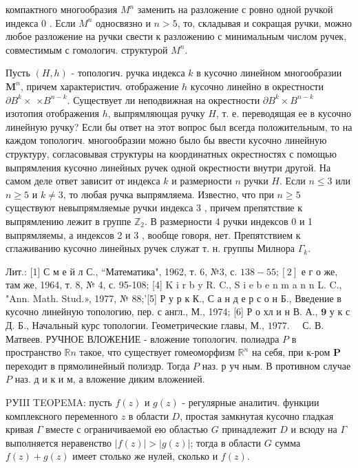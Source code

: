 \documentclass[10pt]{article}
\begin{document}
компактного многообразия $M^{n}$ заменить на разложение с ровно одной ручкой индекса 0 . Если $M^{n}$ односвязно и $n>5$, то, складывая и сокращая ручки, можно любое разложение на ручки свести к разложению с минимальным числом ручек, совместимым с гомологич. структурой $M^{n}$.



Пусть $(H, h)$ - топологич. ручка индекса $k$ в кусочно линейном многообразии $\boldsymbol{M}^{n}$, причем характеристич. отображение $h$ кусочно линейно в окрестности $\partial B^{k} \times$ $\times B^{n-k}$. Существует ли неподвижная на окрестности $\partial B^{k} \times B^{n-k}$ изотопия отображения $h$, выпрямляющая ручку $H$, т. е. переводящая ее в кусочно линейную ручку? Если бы ответ на этот вопрос был всегда положительным, то на каждом топологич. многообразии можно было бы ввести кусочно линейную структуру, согласовывая структуры на координатных окрестностях с помощью выпрямления кусочно линейных ручек одной окрестности внутри другой. На самом деле ответ зависит от индекса $k$ и размерности $n$ ручки $H$. Если $n \leqslant 3$ или $n \geqslant 5$ и $k \neq 3$, то любая ручка выпрямляема. Известно, что при $n \geqslant 5$ существуют невыпрямляемые ручки индекса 3 , причем препятствие к выпрямлению лежит в группе $\mathbb{Z}_{2}$. В размерности 4 ручки индексов 0 и 1 выпрямляемы, а индексов 2 и 3 , вообще говоря, нет. Препятствием к сглаживанию кусочно линейных ручек служат т. н. группы Милнора $\Gamma_{k}$.



Лит.: [1] С м е й л С., “Математика", 1962, т. 6, №3, с. $138-55 ;[2]$ е г о же, там же, 1964, т. 8, № 4, с. 95-108; [4] K i r b y R. C., S i e b e n m a n n L. C., "Ann. Math. Stud.», 1977, № 88;'[5] Р у р к К., С а н д е р с о н Б., Введение в кусочно линейную топологию, пер. с англ., М., 1974; [6] Р о хл и н В. А., $\mathbf{9}$ у к с Д. Б., Начальный курс топологии. Геометрические главы, М., $1977 . \quad$ С. В. Матвеев. РУЧНОЕ ВЛОЖЕНИЕ - вложение топологич. полиәдра $P$ в пространство $\mathbb{R} n$ такое, что существует гомеоморфизм $\mathbb{R}^{n}$ на себя, при к-ром $\boldsymbol{P}$ переходит в прямолинейный полиэдр. Тогда $P$ наз. р уч ным. В противном случае $P$ наз. д и к и м, а вложение диким вложенией.



PУIII TEOPEMA: пусть $f(z)$ и $g(z)$ - регулярные аналитич. функции комплексного переменного $z$ в области $D$, простая замкнутая кусочно гладкая кривая $\Gamma$ вместе с ограничиваемой ею областью $G$ принадлежит $D$ и всюду на $\Gamma$ выполняется неравенство $|f(z)|>|g(z)|$; тогда в области $G$ сумма $f(z)+g(z)$ имеет столько же нулей, сколько и $f(z)$.
\end{document}
